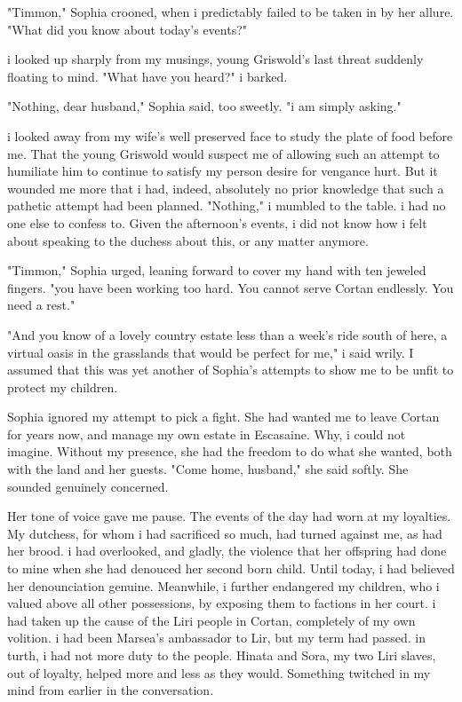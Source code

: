\documentclass{article}
\begin{document}
"Timmon," Sophia crooned, when i predictably failed to be taken in by her allure. "What did you know about today's events?"

i looked up sharply from my musings, young Griswold's last threat suddenly floating to mind. "What have you heard?" i barked.

"Nothing, dear husband," Sophia said, too sweetly. "i am simply asking."

i looked away from my wife's well preserved face to study the plate of food before me. That the young Griswold would suspect me of allowing such an attempt to humiliate him to continue to satisfy my person desire for vengance hurt. But it wounded me more that i had, indeed, absolutely no prior knowledge that such a pathetic attempt had been planned. "Nothing," i mumbled to the table. i had no one else to confess to. Given the afternoon's events, i did not know how i felt about speaking to the duchess about this, or any matter anymore.

"Timmon," Sophia urged, leaning forward to cover my hand with ten jeweled fingers. "you have been working too hard. You cannot serve Cortan endlessly. You need a rest."

"And you know of a lovely country estate less than a week's ride south of here, a virtual oasis in the grasslands that would be perfect for me," i said wrily. I assumed that this was yet another of Sophia's attempts to show me to be unfit to protect my children.

Sophia ignored my attempt to pick a fight. She had wanted me to leave Cortan for years now, and manage my own estate in Escasaine. Why, i could not imagine. Without my presence, she had the freedom to do what she wanted, both with the land and her guests. "Come home, husband," she said softly. She sounded genuinely concerned.

Her tone of voice gave me pause. The events of the day had worn at my loyalties. My dutchess, for whom i had sacrificed so much, had turned against me, as had her brood. i had overlooked, and gladly, the violence that her offspring had done to mine when she had denouced her second born child. Until today, i had believed her denounciation genuine. Meanwhile, i further endangered my children, who i valued above all other possessions, by exposing them to factions in her court. i had taken up the cause of the Liri people in Cortan, completely of my own volition. i had been Marsea's ambassador to Lir, but my term had passed. in turth, i had not more duty to the people. Hinata and Sora, my two Liri slaves, out of loyalty, helped more and less as they would. Something twitched in my mind from earlier in the conversation.
\end{document}
